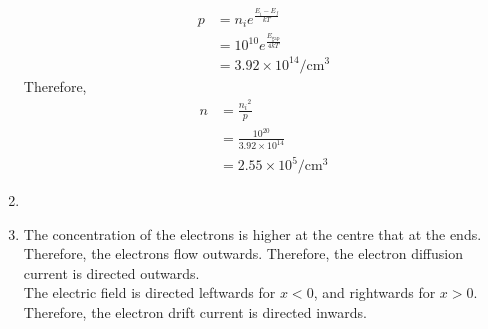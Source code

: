 \documentclass[titlepage, fleqn, a4paper, 12pt, twoside]{article}
\theoremstyle{definition}
\theoremstyle{theorem}
\begin{document}
\begin{solution}
\begin{enumerate}[leftmargin=*]
			\begin{align*}
				p & = n_i e^{\frac{E_i - E_f}{k T}}            \\
                                  & = 10^{10} e^{\frac{E_{\text{gap}}}{4 k T}} \\
                                  & = 3.92 \times 10^{14} \si{\per\centi\metre\cubed}
			\end{align*}
			Therefore,
			\begin{align*}
				n & = \frac{{n_i}^2}{p}                   \\
                                  & = \frac{10^{20}}{3.92 \times 10^{14}} \\
                                  & = 2.55 \times 10^5 \si{\per\centi\metre\cubed}
			\end{align*}
		\item
			~\\
			\begin{figure}[H]
				\centering
			\end{figure}
		\item
			The concentration of the electrons is higher at the centre that at the ends.
			Therefore, the electrons flow outwards.
			Therefore, the electron diffusion current is directed outwards.\\
			The electric field is directed leftwards for $x < 0$, and rightwards for $x > 0$.
			Therefore, the electron drift current is directed inwards.
	\end{enumerate}
\end{solution}
\end{document}
